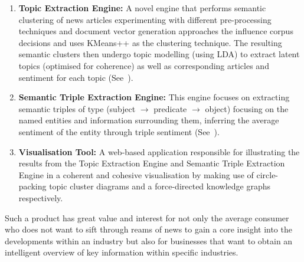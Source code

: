\begin{enumerate}
    \item \textbf{Topic Extraction Engine:} A novel engine that performs semantic clustering of news articles experimenting with different pre-processing techniques and document vector generation approaches the influence corpus decisions and uses KMeans++ as the clustering technique. The resulting semantic clusters then undergo topic modelling (using LDA) to extract latent topics (optimised for coherence) as well as corresponding articles and sentiment for each topic (See~).

    \item \textbf{Semantic Triple Extraction Engine:} This engine focuses on extracting semantic triples of type (subject $\rightarrow$ predicate $\rightarrow$ object) focusing on the named entities and information surrounding them, inferring the average sentiment of the entity through triple sentiment (See~).
  
    \item \textbf{Visualisation Tool:} A web-based application responsible for illustrating the results from the Topic Extraction Engine and Semantic Triple Extraction Engine in a coherent and cohesive visualisation by making use of circle-packing topic cluster diagrams and a force-directed knowledge graphs respectively. 


\end{enumerate}


Such a product has great value and interest for not only the average consumer who does not want to sift through reams of news to gain a core insight into the developments within an industry but also for businesses that want to obtain an intelligent overview of key information within specific industries.



